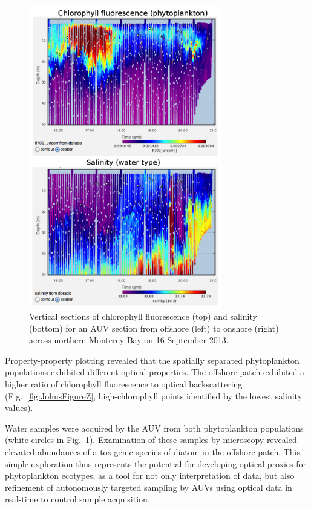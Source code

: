 \begin{figure}[htbp]
\centering
\includegraphics[width=3.3in]{JohnsFigureY.png}
\caption{Vertical sections of chlorophyll fluorescence (top) and salinity (bottom) for an AUV section from offshore (left) to onshore (right) across northern Monterey Bay on 16 September 2013.}
\label{fig:JohnsFigureY}
\end{figure}

Property-property plotting revealed that the spatially separated phytoplankton populations exhibited different optical properties.  The offshore patch exhibited a higher ratio of chlorophyll fluorescence to optical backscattering (Fig.~\ref{fig:JohnsFigureZ}, high-chlorophyll points identified by the lowest salinity values).

Water samples were acquired by the AUV from both phytoplankton populations (white circles in Fig.~\ref{fig:JohnsFigureY}).  Examination of these samples by microscopy revealed elevated abundances of a toxigenic species of diatom in the offshore patch.  This simple exploration thus represents the potential for developing optical proxies for phytoplankton ecotypes, as a tool for not only interpretation of data, but also refinement of autonomously targeted sampling by AUVs using optical data in real-time to control sample acquisition.

